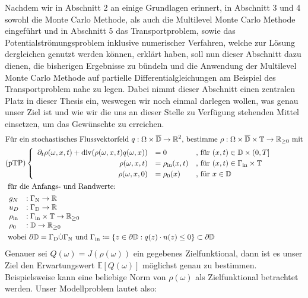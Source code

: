 Nachdem wir in Abschnitt 2 an einige Grundlagen erinnert, in Abschnitt 3 und 4 sowohl die Monte Carlo Methode, als auch die Multilevel Monte Carlo Methode eingeführt und in Abschnitt 5 das Transportproblem, sowie das Potentialströmungsproblem inklusive numerischer Verfahren, welche zur Lösung dergleichen genutzt werden können, erklärt haben, soll nun dieser Abschnitt dazu dienen, die bisherigen Ergebnisse zu bündeln und die Anwendung der Multilevel Monte Carlo Methode auf partielle Differentialgleichungen am Beispiel des Transportproblem nahe zu legen. Dabei nimmt dieser Abschnitt einen zentralen Platz in dieser Thesis ein, weswegen wir noch einmal darlegen wollen, was genau unser Ziel ist und wie wir die uns an dieser Stelle zu Verfügung stehenden Mittel einsetzen, um das Gewünschte zu erreichen.
\begin{align*}
&\text{Für ein stochastisches Flussvektorfeld } q: \Omega \times \overline{\mathbb{D}} \to \R^2 \text{, bestimme }\rho: \Omega \times \overline{\mathbb{D}} \times \mathbb{T} \to \R_{\geq 0} \text{ mit} \\
&\text{(pTP)} 
\begin{cases}
\begin{array}{rlll}
\partial_t \rho (\omega, x, t) + \dive(\rho(\omega,x,t)q(\omega,x)) &= 0 &\text{, für } (x,t) \in \mathbb{D} \times (0,T] \\
\rho(\omega,x,t) &= \rho_{\text{in}}(x,t) &\text{, für } (x,t) \in \Gamma_{\text{in}} \times \mathbb{T} \\
\rho(\omega,x,0)  &= \rho_0(x) &\text{, für } x \in  \mathbb{D}
\end{array}
\end{cases} \\
&\text{ für die Anfangs- und Randwerte: } \\ 
&\begin{array}{llr}
g_N&: \Gamma_{\text{N}} \to \R \\
u_D&: \Gamma_{\text{D}} \to \R \\
\rho_{\text{in}}&: \Gamma_{\text{in}} \times \mathbb{T} \to \R_{\geq0} \\
\rho_0&: \mathbb{D} \to \R_{\geq0} \\
\end{array} \newline \\
&\text{ wobei } \partial \mathbb{D} = \Gamma_{\text{D}} \dot{\cup} \Gamma_{\text{N}}  \text{ und }  \Gamma_{\text{in}} \coloneqq  \{ z \in \partial \mathbb{D}: q(z)\cdot n(z) \leq 0 \} \subset  \partial \mathbb{D}
\end{align*}
Genauer sei $ Q(\omega) = J(\rho(\omega)) $ ein gegebenes Zielfunktional, dann ist es unser Ziel den Erwartungswert $ \mathbb{E}[Q(\omega)] $ möglichst genau zu bestimmen. Beispielsweise kann eine beliebige Norm von $ \rho(\omega) $ als Zielfunktional betrachtet werden.
Unser Modellproblem lautet also:

